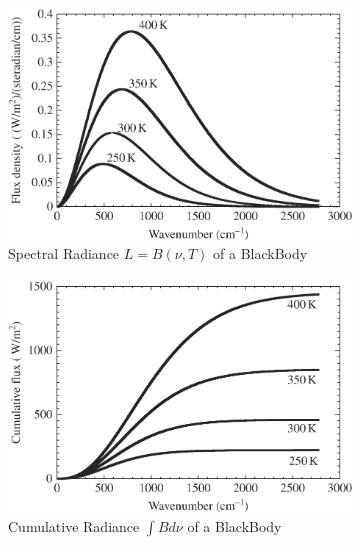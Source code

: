 \begin{figure}[H]
    \centering
    \begin{subfigure}{0.35\linewidth}
        \includegraphics[width=\linewidth]{Figures/Radiative Transfer/BB Spectral Radiance.png}
        \caption{Spectral Radiance $L=B(\nu,T)$ of a BlackBody}
        \label{Spec Rad BB}
    \end{subfigure}
    \begin{subfigure}{0.35\linewidth}
        \includegraphics[width=\linewidth]{Figures/Radiative Transfer/BB Cumulative.png}
        \caption{Cumulative Radiance $\int B d\nu$ of a BlackBody}
        \label{Cum BB}
    \end{subfigure}
    \begin{subfigure}{0.25\linewidth}

\end{subfigure}
\end{figure}
